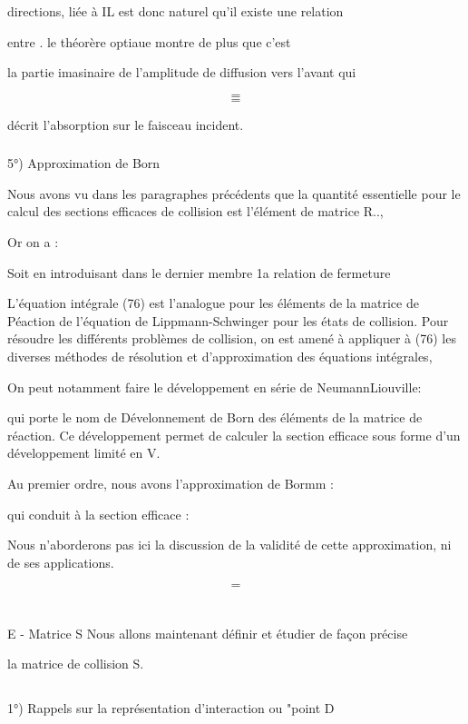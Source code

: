 directions, liée à  IL est donc naturel qu'il existe une relation

entre . le théorère optiaue montre de plus que c'est

la partie imasinaire de l'amplitude de diffusion vers l'avant  qui

\[
\tag{71}=
\]
\[
\tag{78}=
\]


décrit l'absorption sur le faisceau incident.

\subsubsection{}%
5°) Approximation de Born

Nous avons vu dans les paragraphes précédents que la quantité
essentielle pour le calcul des sections efficaces de collision est l'élément de
matrice R..,

Or on a :

Soit en introduisant dans le dernier membre 1a relation de fermeture

L'équation intégrale (76) est l'analogue pour les éléments de la matrice
de Péaction de l'équation de Lippmann-Schwinger pour les états de collision.
Pour résoudre les différents problèmes de collision, on est amené à appliquer à
(76) les diverses méthodes de résolution et d'approximation des
équations intégrales,

On peut notamment faire le développement en série de NeumannLiouville:

qui porte le nom de Dévelonnement de Born des éléments de la matrice de
réaction. Ce développement permet de calculer la section efficace sous
forme d'un développement limité en V.

Au premier ordre, nous avons l'approximation de Bormm : 

qui conduit à la section efficace :

Nous n'aborderons pas ici la discussion de la validité de cette approximation,
ni de ses applications.

\[
\tag{80}=
\]


\section{}%
E - Matrice S
Nous allons maintenant définir et étudier de façon précise

la matrice de collision S.

\subsection{}%
1°) Rappels sur la représentation d'interaction ou "point
D

